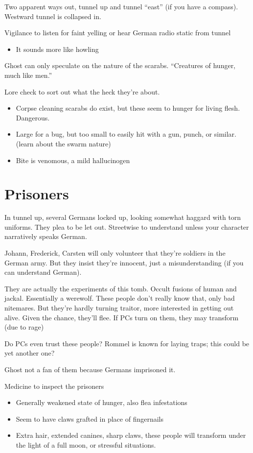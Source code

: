 \documentclass{book}
\newcommand{\df}{\DifficultyDie }
\newcommand{\stb}{\SetbackDie }
\begin{document}
\begin{multicols}{2}
Two apparent ways out, tunnel up and tunnel ``east'' (if you have a compass).  Westward tunnel is collapsed in.

\df\df Vigilance to listen for faint yelling or hear German radio static from tunnel
\begin{itemize}
    \item \Advantage It sounds more like howling
\end{itemize}

Ghost can only speculate on the nature of the scarabs.  ``Creatures of hunger, much like men.''

\df\df Lore check to sort out what the heck they're about.
    \begin{itemize}
        \item \Success Corpse cleaning scarabs do exist, but these seem to hunger for living flesh.  Dangerous.
        \item \Advantage Large for a bug, but too small to easily hit with a gun, punch, or similar.  (learn about the swarm nature)
        \item \Advantage Bite is venomous, a mild hallucinogen
    \end{itemize}

\section{Prisoners}

In tunnel up, several Germans locked up, looking somewhat haggard with torn uniforms.  They plea to be let out.  \df\df Streetwise to understand unless your character narratively speaks German.

Johann, Frederick, Carsten will only volunteer that they're soldiers in the German army.  But they insist they're innocent, just a misunderstanding (if you can understand German).

They are actually the experiments of this tomb.  Occult fusions of human and jackal.  Essentially a werewolf.  These people don't really know that, only bad nitemares.  But they're hardly turning traitor, more interested in getting out alive.  Given the chance, they'll flee.  If PCs turn on them, they may transform (due to rage)

Do PCs even trust these people?  Rommel is known for laying traps; this could be yet another one?

Ghost not a fan of them because Germans imprisoned it.

\df\df\stb\stb Medicine to inspect the prisoners
    \begin{itemize}
        \item \Success Generally weakened state of hunger, also flea infestations
        \item \Advantage\Advantage Seem to have claws grafted in place of fingernails
        \item \Triumph Extra hair, extended canines, sharp claws, these people will transform under the light of a full moon, or stressful situations.
    \end{itemize}


\end{multicols}
\end{document}
